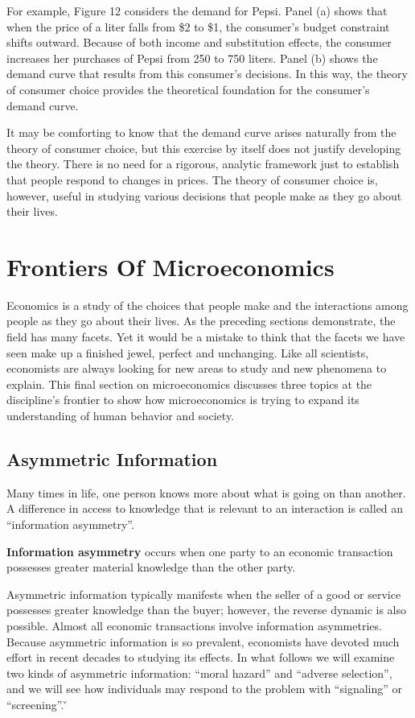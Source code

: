 For example, Figure 12 considers the demand for Pepsi. Panel (a) shows that when the price of a liter falls from \$2
to \$1, the consumer's budget constraint shifts outward. Because of both income and substitution effects, the
consumer increases her purchases of Pepsi from 250 to 750 liters. Panel (b) shows the demand curve that results from
this consumer's decisions. In this way, the theory of consumer choice provides the theoretical foundation for the
consumer's demand curve.


It may be comforting to know that the demand curve arises naturally from the theory of consumer choice, but this
exercise by itself does not justify developing the theory. There is no need for a rigorous, analytic framework just
to establish that people respond to changes in prices. The theory of consumer choice is, however, useful in studying
various decisions that people make as they go about their lives.

\section{Frontiers Of Microeconomics}

Economics is a study of the choices that people make and the interactions among people as they go about their lives.
As the preceding sections demonstrate, the field has many facets. Yet it would be a mistake to think that the facets
we have seen make up a finished jewel, perfect and unchanging. Like all scientists, economists are always looking for
new areas to study and new phenomena to explain. This final section on microeconomics discusses three topics at the
discipline's frontier to show how microeconomics is trying to expand its understanding of human behavior and society.

\subsection{Asymmetric Information}

Many times in life, one person knows more about what is going on than another. A difference in access to knowledge
that is relevant to an interaction is called an ``information asymmetry''.

\textbf{Information asymmetry} occurs when one party to an economic transaction possesses greater material knowledge
than the other party.
\ed

Asymmetric information typically manifests when the seller of a good or service possesses greater knowledge than the
buyer; however, the reverse dynamic is also possible. Almost all economic transactions involve information
asymmetries. Because asymmetric information is so prevalent, economists have devoted much effort in recent decades to
studying its effects. In what follows we will examine two kinds of asymmetric information: ``moral hazard'' and
``adverse selection'', and we will see how individuals may respond to the problem with ``signaling'' or ``screening''.
\v

